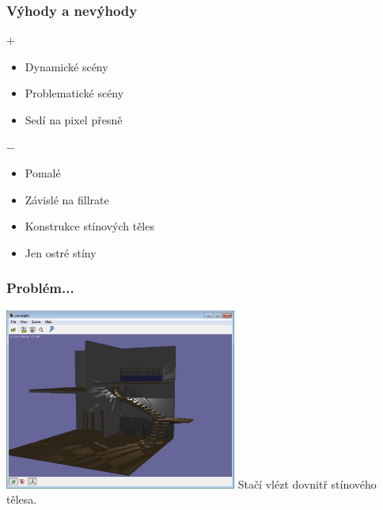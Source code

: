 \begin{frame}
    \frametitle{Výhody a nevýhody}
    
    $+$
    \begin{itemize}
        \item Dynamické scény
        \item Problematické scény
        \item Sedí na pixel přesně
    \end{itemize}

    \vfill
    $-$
    \begin{itemize}
        \item Pomalé
        \item Závislé na fillrate
        \item Konstrukce stínových těles
        \item Jen ostré stíny
    \end{itemize}
\end{frame}

\begin{frame}
    \frametitle{Problém...}
    \includegraphics[width=3in]{pics/shadows/shadowVolumes/ZPass-fail.eps}
    \pause\vfill
    Stačí vlézt dovnitř stínového tělesa.
\end{frame}

